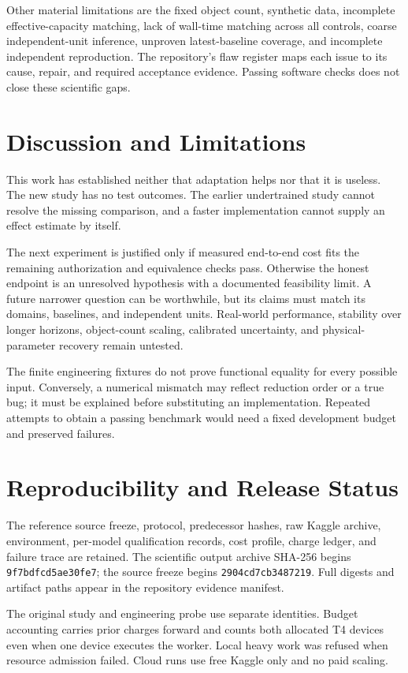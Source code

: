 \documentclass[10pt]{article}
\begin{document}
Other material limitations are the fixed object count, synthetic data, incomplete effective-capacity matching, lack of wall-time matching across all controls, coarse independent-unit inference, unproven latest-baseline coverage, and incomplete independent reproduction. The repository's flaw register maps each issue to its cause, repair, and required acceptance evidence. Passing software checks does not close these scientific gaps.

\section{Discussion and Limitations}
This work has established neither that adaptation helps nor that it is useless. The new study has no test outcomes. The earlier undertrained study cannot resolve the missing comparison, and a faster implementation cannot supply an effect estimate by itself.

The next experiment is justified only if measured end-to-end cost fits the remaining authorization and equivalence checks pass. Otherwise the honest endpoint is an unresolved hypothesis with a documented feasibility limit. A future narrower question can be worthwhile, but its claims must match its domains, baselines, and independent units. Real-world performance, stability over longer horizons, object-count scaling, calibrated uncertainty, and physical-parameter recovery remain untested.

The finite engineering fixtures do not prove functional equality for every possible input. Conversely, a numerical mismatch may reflect reduction order or a true bug; it must be explained before substituting an implementation. Repeated attempts to obtain a passing benchmark would need a fixed development budget and preserved failures.

\section{Reproducibility and Release Status}
The reference source freeze, protocol, predecessor hashes, raw Kaggle archive, environment, per-model qualification records, cost profile, charge ledger, and failure trace are retained. The scientific output archive SHA-256 begins \texttt{9f7bdfcd5ae30fe7}; the source freeze begins \texttt{2904cd7cb3487219}. Full digests and artifact paths appear in the repository evidence manifest.

The original study and engineering probe use separate identities. Budget accounting carries prior charges forward and counts both allocated T4 devices even when one device executes the worker. Local heavy work was refused when resource admission failed. Cloud runs use free Kaggle only and no paid scaling.
\end{document}
